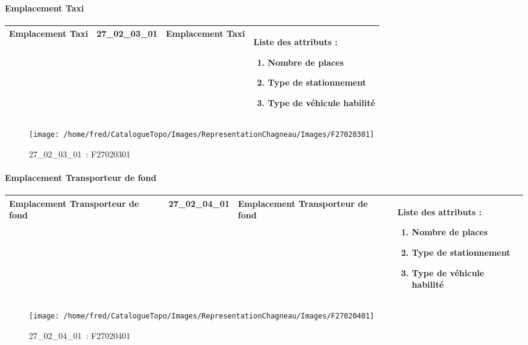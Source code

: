 \documentclass[12pt,titlepage,oneside]{book}
\begin{document}
\paragraph{Emplacement Taxi}
\noindent
\vspace{\baselineskip}

\renewcommand{\arraystretch}{1.2}
\begin{supertabular}{|p{10cm}|c|p{13cm}|p{12cm}|}
 Emplacement Taxi & 27\_02\_03\_01 & Emplacement Taxi & Liste des attributs :
\begin{enumerate}
  \item Nombre de places  \item Type de stationnement  \item Type de véhicule habilité\end{enumerate}
\\
\hline
\end{supertabular}
\begin{figure}[h!]
  \hfill         %
  \begin{minipage}[t]{3cm}
    \begin{center}
      \texttt{[image: /home/fred/CatalogueTopo/Images/RepresentationChagneau/Images/F27020301]}
      \caption[~27\_02\_03\_01]{\small{27\_02\_03\_01~:} \tiny{F27020301}}\label{F27020301}
    \end{center}
  \end{minipage}
\end{figure}


\paragraph{Emplacement Transporteur de fond}
\noindent
\vspace{\baselineskip}

\renewcommand{\arraystretch}{1.2}
\begin{supertabular}{|p{10cm}|c|p{13cm}|p{12cm}|}
 Emplacement Transporteur de fond & 27\_02\_04\_01 & Emplacement Transporteur de fond & Liste des attributs :
\begin{enumerate}
  \item Nombre de places  \item Type de stationnement  \item Type de véhicule habilité\end{enumerate}
\\
\hline
\end{supertabular}
\begin{figure}[h!]
  \hfill         %
  \begin{minipage}[t]{3cm}
    \begin{center}
      \texttt{[image: /home/fred/CatalogueTopo/Images/RepresentationChagneau/Images/F27020401]}
      \caption[~27\_02\_04\_01]{\small{27\_02\_04\_01~:} \tiny{F27020401}}\label{F27020401}
    \end{center}
  \end{minipage}
\end{figure}
\end{document}
